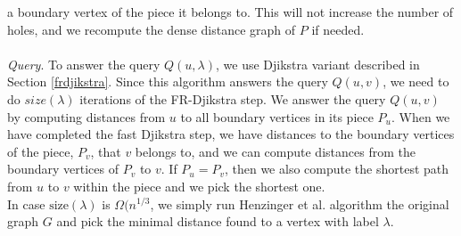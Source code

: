 a boundary vertex of the piece it belongs to. This will not increase the number of holes,
and we recompute the dense distance graph of $P$ if needed. \\
\\
\indent \textit{Query}. To answer the query $Q(u,\lambda)$, we use Djikstra variant
described in Section \ref{frdjikstra}. Since this algorithm answers the query $Q(u,v)$,
we need to do $size(\lambda)$ iterations of the FR-Djikstra step. We answer the query
$Q(u,v)$ by computing distances from $u$ to all boundary vertices in its piece $P_u$.
When we have completed the fast Djikstra step, we have distances to the boundary vertices
of the piece, $P_v$, that $v$ belongs to, and we can compute distances from the boundary
vertices of $P_v$ to $v$. If $P_u=P_v$, then we also compute the shortest path from $u$
to $v$ within the piece and we pick the shortest one. \\
In case $\text{size}(\lambda)$ is $\Omega(n^{1/3}$, we simply run Henzinger et al.
\cite{henzinger1997faster} algorithm the original graph $G$ and pick the minimal distance
found to a vertex with label $\lambda$.

